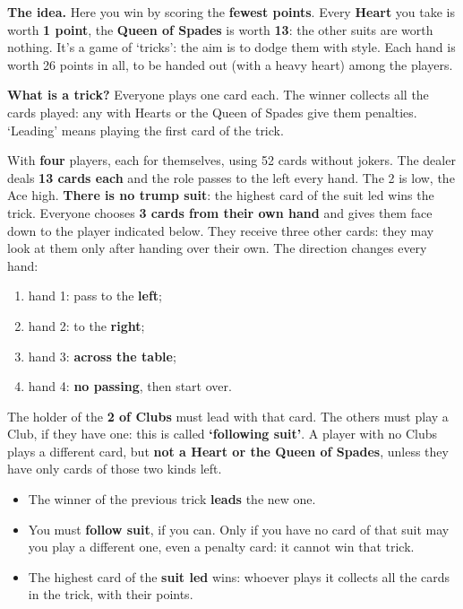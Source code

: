 \documentclass[10pt]{article}
\begin{document}
\startpage\label{cuori}
\textbf{The idea.} Here you win by scoring the \textbf{fewest points}. Every \textbf{Heart} you take is worth \textbf{1 point}, the \textbf{Queen of Spades} is worth \textbf{13}: the other suits are worth nothing. It’s a game of ‘tricks’: the aim is to dodge them with style. Each hand is worth 26 points in all, to be handed out (with a heavy heart) among the players.

\begin{callout}
\textbf{What is a trick?} Everyone plays one card each. The winner collects all the cards played: any with Hearts or the Queen of Spades give them penalties. ‘Leading’ means playing the first card of the trick.
\end{callout}
With \textbf{four} players, each for themselves, using 52 cards without jokers. The dealer deals \textbf{13 cards each} and the role passes to the left every hand. The 2 is low, the Ace high. \textbf{There is no trump suit}: the highest card of the suit led wins the trick.
Everyone chooses \textbf{3 cards from their own hand} and gives them face down to the player indicated below. They receive three other cards: they may look at them only after handing over their own. The direction changes every hand:
\begin{enumerate}
	\item hand 1: pass to the \textbf{left};
	\item hand 2: to the \textbf{right};
	\item hand 3: \textbf{across the table};
	\item hand 4: \textbf{no passing}, then start over.
\end{enumerate}

The holder of the \textbf{2 of Clubs} must lead with that card. The others must play a Club, if they have one: this is called \textbf{‘following suit’}. A player with no Clubs plays a different card, but \textbf{not a Heart or the Queen of Spades}, unless they have only cards of those two kinds left.

\startpage
{}
\begin{itemize}
 \item The winner of the previous trick \textbf{leads} the new one.
 \item You must \textbf{follow suit}, if you can. Only if you have no card of that suit may you play a different one, even a penalty card: it cannot win that trick.
 \item The highest card of the \textbf{suit led} wins: whoever plays it collects all the cards in the trick, with their points.
\end{itemize}
\end{document}
